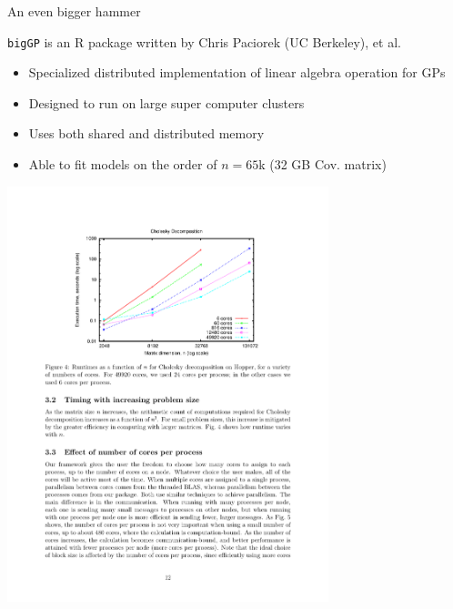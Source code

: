 \documentclass[11pt,ignorenonframetext,]{beamer}
\begin{document}
\begin{frame}[fragile]{An even bigger hammer}

\small
\texttt{bigGP} is an R package written by Chris Paciorek (UC Berkeley),
et al.

\begin{itemize}
\item
  Specialized distributed implementation of linear algebra operation for
  GPs
\item
  Designed to run on large super computer clusters
\item
  Uses both shared and distributed memory
\item
  Able to fit models on the order of \(n = 65\)k (32 GB Cov. matrix)
\end{itemize}

\vspace{-3mm}

\begin{center}
\includegraphics[width=0.7\textwidth]{figs/Paciorek.pdf}
\end{center}

\end{frame}
\end{document}

